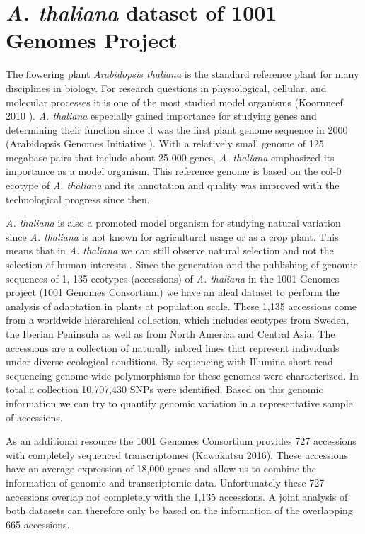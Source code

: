 \section{\textit{A. thaliana} dataset of 1001 Genomes Project}
The flowering plant \textit{Arabidopsis thaliana} is the standard reference plant for many disciplines in biology. For research questions in physiological, cellular, and molecular processes it is one of the most studied model organisms (Koornneef 2010 \cite{Koornneef2010}). \textit{A. thaliana} especially gained importance for studying genes and determining their function since it was the first plant genome sequence in 2000 (Arabidopsis Genomes Initiative \cite{AGI2000}). With a relatively small genome of 125 megabase pairs that include about 25 000 genes, \textit{A. thaliana} emphasized its importance as a model organism. This reference genome is based on the col-0 ecotype of \textit{A. thaliana} and its annotation and quality was improved with the technological progress since then.

\textit{A. thaliana} is also a promoted model organism for studying natural variation since \textit{A. thaliana} is not known for agricultural usage or as a crop plant. This means that in \textit{A. thaliana} we can still observe natural selection and not the selection of human interests \cite{Koornneef2010}. Since the generation and the publishing of genomic sequences of 1, 135 ecotypes (accessions) of \textit{A. thaliana} in the 1001 Genomes project (1001 Genomes Consortium\cite{1001Genomes2016})  we have an ideal dataset to perform the analysis of adaptation in plants at population scale. These 1,135 accessions come from a worldwide hierarchical collection, which includes ecotypes from Sweden, the Iberian Peninsula as well as from North America and Central Asia. The accessions are a collection of naturally inbred lines that represent individuals under diverse ecological conditions. By sequencing with Illumina short read sequencing genome-wide polymorphisms for these genomes were characterized. In total a collection 10,707,430 SNPs were identified. Based on this genomic information we can try to quantify genomic variation in a representative sample of accessions.

As an additional resource the 1001 Genomes Consortium provides 727 accessions with completely sequenced transcriptomes (Kawakatsu 2016\cite{Kawakatsu2016}). These accessions have an average expression of 18,000 genes and allow us to combine the information of genomic and transcriptomic data. Unfortunately these 727 accessions overlap not completely with the 1,135 accessions. A joint analysis of both datasets can therefore only be based on the information of the overlapping 665 accessions. 
